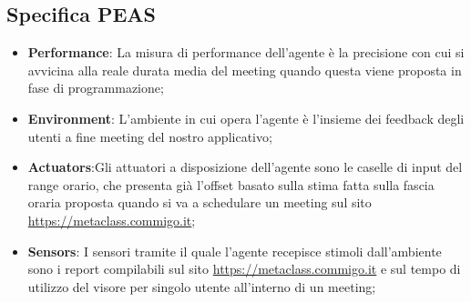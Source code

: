 \subsection{Specifica PEAS}
\fancyhead{}    %
\label{paragrafo 1.2}
\par{
\begin{itemize}
    \item \textbf{Performance}: La misura di performance dell'agente è la precisione con cui si avvicina alla reale durata media del meeting quando questa viene proposta in fase di programmazione;
    \item \textbf{Environment}: L'ambiente in cui opera l'agente è l'insieme dei feedback degli utenti a fine meeting del nostro applicativo;
    \item \textbf{Actuators}:Gli attuatori a disposizione dell'agente sono le caselle di input del range orario, che presenta già l'offset basato sulla stima fatta sulla fascia oraria proposta quando si va a schedulare un meeting sul sito \url{https://metaclass.commigo.it};
    \item \textbf{Sensors}: I sensori tramite il quale l'agente recepisce stimoli dall'ambiente sono i report compilabili sul sito \url{https://metaclass.commigo.it} e sul tempo di utilizzo del visore per singolo utente all'interno di un meeting;
\end{itemize}
}
